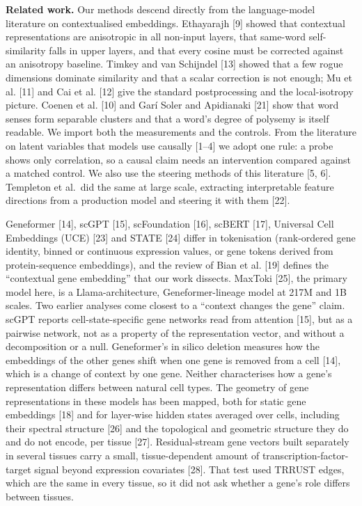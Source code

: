 \documentclass[
  11pt,
]{article}
\begin{document}
\textbf{Related work.} Our methods descend directly from the
language-model literature on contextualised embeddings. Ethayarajh
{[}9{]} showed that contextual representations are anisotropic in all
non-input layers, that same-word self-similarity falls in upper layers,
and that every cosine must be corrected against an anisotropy baseline.
Timkey and van Schijndel {[}13{]} showed that a few rogue dimensions
dominate similarity and that a scalar correction is not enough; Mu et
al. {[}11{]} and Cai et al. {[}12{]} give the standard postprocessing
and the local-isotropy picture. Coenen et al. {[}10{]} and Garí Soler
and Apidianaki {[}21{]} show that word senses form separable clusters
and that a word's degree of polysemy is itself readable. We import both
the measurements and the controls. From the literature on latent
variables that models use causally {[}1--4{]} we adopt one rule: a probe
shows only correlation, so a causal claim needs an intervention compared
against a matched control. We also use the steering methods of this
literature {[}5, 6{]}. Templeton et al.~did the same at large scale,
extracting interpretable feature directions from a production model and
steering it with them {[}22{]}.

Geneformer {[}14{]}, scGPT {[}15{]}, scFoundation {[}16{]}, scBERT
{[}17{]}, Universal Cell Embeddings (UCE) {[}23{]} and STATE {[}24{]}
differ in tokenisation (rank-ordered gene identity, binned or continuous
expression values, or gene tokens derived from protein-sequence
embeddings), and the review of Bian et al. {[}19{]} defines the
``contextual gene embedding'' that our work dissects. MaxToki {[}25{]},
the primary model here, is a Llama-architecture, Geneformer-lineage
model at 217M and 1B scales. Two earlier analyses come closest to a
``context changes the gene'' claim. scGPT reports cell-state-specific
gene networks read from attention {[}15{]}, but as a pairwise network,
not as a property of the representation vector, and without a
decomposition or a null. Geneformer's in silico deletion measures how
the embeddings of the other genes shift when one gene is removed from a
cell {[}14{]}, which is a change of context by one gene. Neither
characterises how a gene's representation differs between natural cell
types. The geometry of gene representations in these models has been
mapped, both for static gene embeddings {[}18{]} and for layer-wise
hidden states averaged over cells, including their spectral structure
{[}26{]} and the topological and geometric structure they do and do not
encode, per tissue {[}27{]}. Residual-stream gene vectors built
separately in several tissues carry a small, tissue-dependent amount of
transcription-factor-target signal beyond expression covariates
{[}28{]}. That test used TRRUST edges, which are the same in every
tissue, so it did not ask whether a gene's role differs between tissues.
\end{document}
